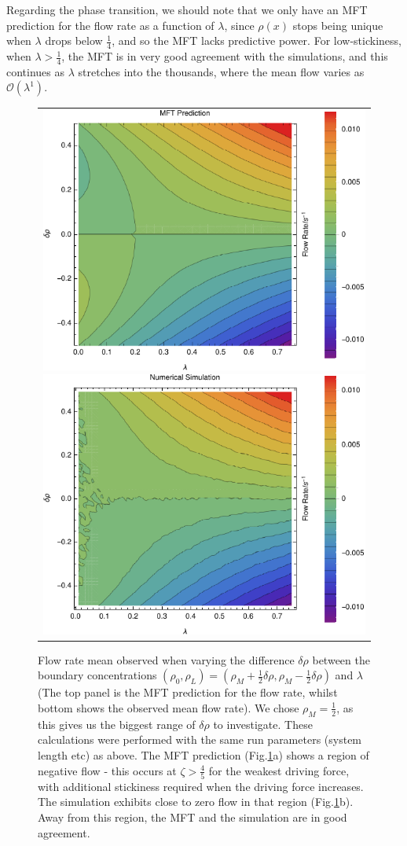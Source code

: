 \documentclass[
reprint, amsmath,amssymb,
]{revtex4-1}
\begin{document}
Regarding the phase transition, we should note that we only have an
MFT prediction for the flow rate as a function of $\lambda$, since
$\rho(x)$ stops being unique when $\lambda$ drops below $\frac{1}{4}$,
and so the MFT lacks predictive power. For low-stickiness, when
$\lambda>\frac{1}{4}$, the MFT is in very good agreement with the
simulations, and this continues as $\lambda$ stretches into the
thousands, where the mean flow varies as $\mathcal{O}(\lambda^1)$.



\begin{figure}[h!]
\vspace{1em}
\begin{center}
 \begin{tabular}{c}
    \includegraphics[width=0.48\linewidth]{newMftPred} 
    \includegraphics[width=0.48\linewidth]{newFlow}
    \end{tabular}
\end{center}
    \vspace{-2.5em}
\caption{\label{fig:constDens} Flow rate mean observed when varying the difference $\delta\rho$ between the boundary concentrations
$(\rho_0, \rho_L) = (\rho_M + \frac{1}{2} \delta\rho, \rho_M - \frac{1}{2} \delta\rho)$ and $\lambda$ (The top panel is the MFT prediction
for the flow rate, whilst bottom shows the observed mean flow rate).
We chose $\rho_M=\frac{1}{2}$, as this gives us the biggest range of $\delta\rho$ to investigate.
These calculations were performed with the same run parameters (system length etc) as above.
The MFT prediction (Fig.\ref{fig:constDens}a) shows a region of
negative flow - this occurs at $\zeta > \frac{4}{5}$ for the weakest
driving force, with additional stickiness required when the driving
force increases. The simulation exhibits close to zero flow in that
region (Fig.\ref{fig:constDens}b).  Away from this region, the MFT and
the simulation are in good agreement.
}
\end{figure}
\end{document}
